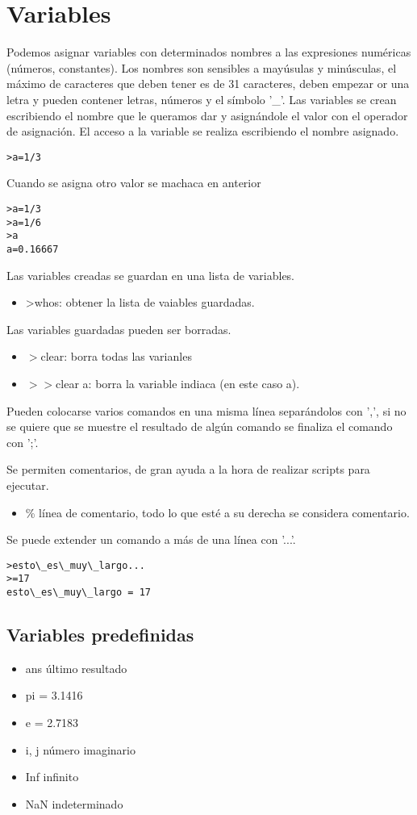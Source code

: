 \documentclass[a4,12pt,graphicx,caption,rotating]{article}
\begin{document}
\section{Variables}
Podemos asignar variables con determinados nombres a las expresiones numéricas (números, constantes). Los nombres son sensibles a mayúsulas y minúsculas, el máximo de caracteres que deben tener es de 31 caracteres, deben empezar or una letra y pueden contener letras, números y el símbolo '\_'. Las variables se crean escribiendo el nombre que le queramos dar y asignándole el valor con el operador de asignación. El acceso a la variable se realiza escribiendo el nombre asignado.
\begin{verbatim}
>a=1/3
\end{verbatim}
Cuando se asigna otro valor se machaca en anterior
\begin{verbatim}
>a=1/3
>a=1/6
>a
a=0.16667
\end{verbatim}
Las variables creadas se guardan en una lista de variables.
\begin{itemize}
\item>whos: obtener la lista de vaiables guardadas.
\end{itemize}
Las variables guardadas pueden ser borradas.
\begin{itemize}
\item$>$clear: borra todas las varianles
\item$>>$clear a: borra la variable indiaca (en este caso a).
\end{itemize}
Pueden colocarse varios comandos en una misma línea separándolos con ',', si no se quiere que se muestre el resultado de algún comando se finaliza el comando con ';'.

Se permiten comentarios, de gran ayuda a la hora de realizar scripts para ejecutar.
\begin{itemize}
\item\% línea de comentario, todo lo que esté a su derecha se considera comentario.
\end{itemize}
Se puede extender un comando a más de una línea con '...'.
\begin{verbatim}
>esto\_es\_muy\_largo...
>=17
esto\_es\_muy\_largo = 17
\end{verbatim}
\subsection{Variables predefinidas}
\begin{itemize}
\item ans último resultado
\item pi = 3.1416
\item e = 2.7183
\item i, j número imaginario
\item Inf infinito
\item NaN indeterminado
\end{itemize}
\end{document}
